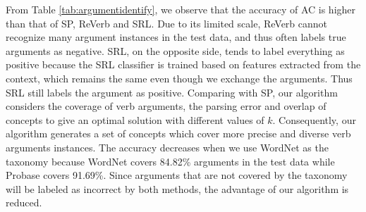 From Table \ref{tab:argumentidentify}, we observe that
the accuracy of AC is higher than that of SP, ReVerb and SRL.
Due to its limited scale, ReVerb cannot recognize many argument
instances in the test data, and thus often labels true arguments
as negative. SRL, on the opposite side, tends to label everything
as positive because the SRL classifier is trained based
on features extracted from the context, which remains the same
even though we exchange the arguments. Thus SRL still labels the
argument as positive.
Comparing with SP, our algorithm considers the coverage of
verb arguments, the parsing error and overlap of concepts to
give an optimal solution with different values of $k$.
Consequently, our algorithm generates a set of concepts
which cover more precise and diverse verb arguments instances.
The accuracy decreases when we use WordNet as the taxonomy
because WordNet covers 84.82\% arguments in the test data
while Probase covers 91.69\%. Since arguments that are not
covered by the taxonomy will be labeled as incorrect
by both methods, the advantage of our algorithm is reduced.

